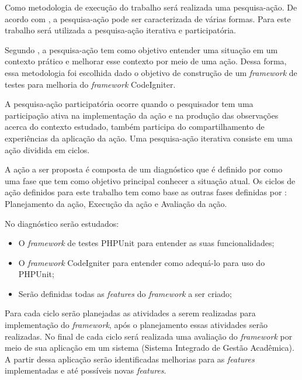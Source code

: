 Como metodologia de execução do trabalho será realizada uma pesquisa-ação. De acordo com , 
a pesquisa-ação pode ser caracterizada de várias formas. Para este trabalho será utilizada a pesquisa-ação iterativa e participatória.

Segundo , a pesquisa-ação tem como objetivo entender uma situação em um contexto prático e melhorar esse contexto por meio de uma ação.
Dessa forma, essa metodologia foi escolhida dado o objetivo de construção de um \textit{framework} de testes para melhoria do \textit{framework} CodeIgniter.

A pesquisa-ação participatória ocorre quando o pesquisador tem uma participação ativa na implementação da ação e na produção das observações acerca do contexto estudado, também participa do compartilhamento de experiências da aplicação da ação. Uma pesquisa-ação iterativa consiste em uma ação dividida em ciclos. \cite{artigo_pesquisa_acao}

A ação a ser proposta é composta de um diagnóstico que é definido por  como uma fase que tem como objetivo principal conhecer a situação atual. Os ciclos de ação definidos para este trabalho tem como base as outras fases definidas por : Planejamento da ação, Execução da ação e Avaliação da ação.

No diagnóstico serão estudados:
	\begin{itemize}
		\item O \textit{framework} de testes PHPUnit para entender as suas funcionalidades;
		\item O \textit{framework} CodeIgniter para entender como adequá-lo para uso do PHPUnit;
		\item Serão definidas todas as \textit{features} do \textit{framework} a ser criado;
	\end{itemize}

Para cada ciclo serão planejadas as atividades a serem realizadas para implementação do \textit{framework}, após o planejamento essas atividades
serão realizadas. No final de cada ciclo será realizada uma avaliação do \textit{framework} por meio de sua aplicação em um sistema (Sistema Integrado de Gestão Acadêmica). A partir dessa aplicação serão identificadas melhorias para as \textit{features} implementadas e até possíveis novas \textit{features}.